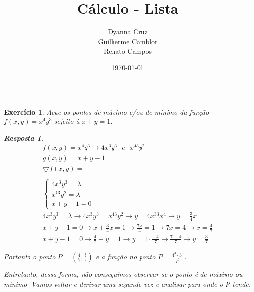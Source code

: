 \documentclass{article}
\newtheorem{ex}{Exercício}
\newtheorem{resp}{Resposta}
\begin{document}
\title{%
    Cálculo - Lista}
\author{Dyanna Cruz\\ Guilherme Camblor\\Renato Campos}
\date{\today}
\maketitle
\[\]

\begin{ex}
    Ache os pontos de máximo e/ou de mínimo da função $f(x,y)=x^4y^3$ sejeito à $x+y=1$.
\begin{resp}
\begin{align*}
    f(x,y)=x^4y^3 \to 4x^3y^3\text{ }e\text{ } x^43y^2\\
    g(x,y)=x+y-1\\
    \bigtriangledown f(x,y) = \\
    \\
    \begin{cases}
     4x^3y^3=\lambda\\
     x^43y^2=\lambda\\
     x+y-1=0
\end{cases}\\
    4x^3y^3=\lambda \to 4x^3y^3=x^43y^2 \to y=4x^33x^4 \to y=\frac{3}{4}x\\
    x+y-1=0\to x+\frac{3}{4}x=1 \to \frac{7x}{4}=1 \to 7x=4 \to x=\frac{4}{7}\\
    x+y-1=0 \to \frac{4}{7} + y = 1 \to y=1\cdot \frac{-4}{7} \to \frac{7-4}{7} \to y=\frac{3}{7}
\end{align*}

    Portanto o ponto $P=\left(\frac{4}{7},\frac{3}{7}\right)$ e a função no ponto $P=\frac{4^4\cdot 3^3}{7^7}$.

    Entretanto, dessa forma, não conseguimos observar se o ponto é de máximo ou mínimo. Vamos voltar e derivar uma segunda vez e analisar para onde o P tende.
\end{resp}
\end{ex}
\end{document}
